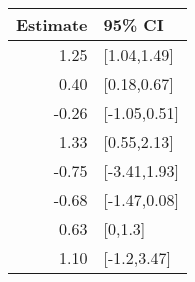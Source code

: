 \begin{tabular}{rl}
  \hline
Estimate & 95\% CI \\ 
  \hline
1.25 & [1.04,1.49] \\ 
  0.40 & [0.18,0.67] \\ 
  -0.26 & [-1.05,0.51] \\ 
  1.33 & [0.55,2.13] \\ 
  -0.75 & [-3.41,1.93] \\ 
  -0.68 & [-1.47,0.08] \\ 
  0.63 & [0,1.3] \\ 
  1.10 & [-1.2,3.47] \\ 
   \hline
\end{tabular}


